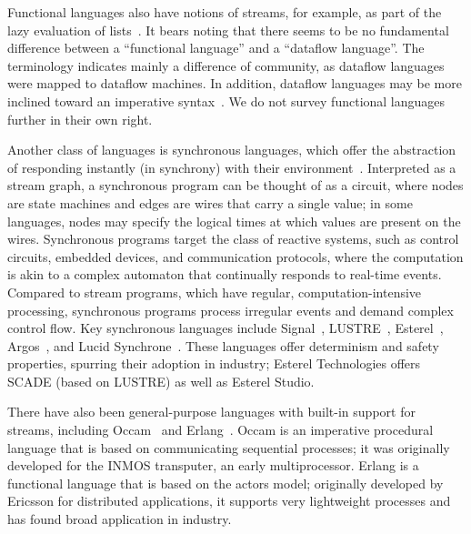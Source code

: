 Functional languages also have notions of streams, for example, as
part of the lazy evaluation of lists~\cite{henderson_lazy_1976}.  It
bears noting that there seems to be no fundamental difference between
a ``functional language'' and a ``dataflow language''.  The
terminology indicates mainly a difference of community, as dataflow
languages were mapped to dataflow machines.  In addition, dataflow
languages may be more inclined toward an imperative
syntax~\cite{johnston_advances_2004}.  We do not survey functional
languages further in their own right.

Another class of languages is synchronous languages, which offer the
abstraction of responding instantly (in synchrony) with their
environment~\cite{halbwachs_synchronous_1998}.  Interpreted as a
stream graph, a synchronous program can be thought of as a circuit,
where nodes are state machines and edges are wires that carry a single
value; in some languages, nodes may specify the logical times at which
values are present on the wires.  Synchronous programs target the
class of reactive systems, such as control circuits, embedded devices,
and communication protocols, where the computation is akin to a
complex automaton that continually responds to real-time events.
Compared to stream programs, which have regular, computation-intensive
processing, synchronous programs process irregular events and demand
complex control flow.  Key synchronous languages include
Signal~\cite{le_guernic_signal--data_1986},
LUSTRE~\cite{caspi_lustre:declarative_1987,halbwachs_synchronous_1991},
Esterel~\cite{berry_esterel_1992},
Argos~\cite{maraninchi_argos:automaton-based_2001}, and Lucid
Synchrone~\cite{caspi95lucidsynchrone,caspi07lucidsynchrone}.  These
languages offer determinism and safety properties, spurring their
adoption in industry; Esterel Technologies offers SCADE (based on
LUSTRE) as well as Esterel Studio.

There have also been general-purpose languages with built-in support
for streams, including Occam~\cite{occammanual} and
Erlang~\cite{armstrong_concurrent_1993,armstrong_history_2007}.  Occam
is an imperative procedural language that is based on communicating
sequential processes; it was originally developed for the INMOS
transputer, an early multiprocessor.  Erlang is a functional language
that is based on the actors model; originally developed by Ericsson
for distributed applications, it supports very lightweight processes
and has found broad application in industry.

